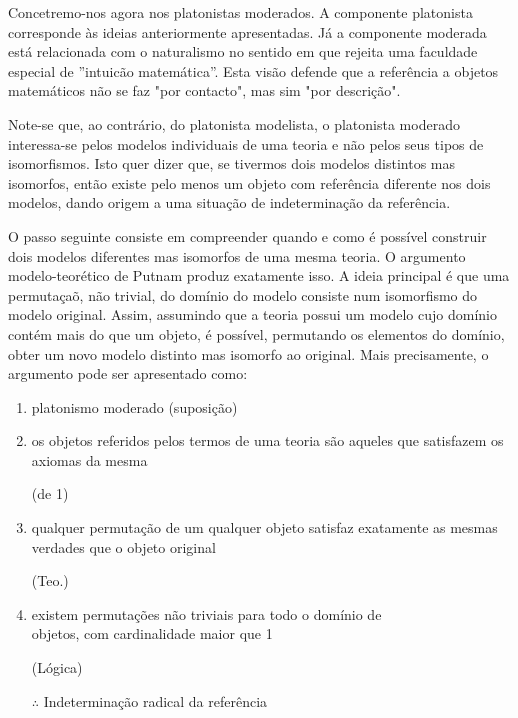 \documentclass{article}
\begin{document}
\vspace{2cm}

Concetremo-nos agora nos platonistas moderados. A componente platonista corresponde às ideias anteriormente apresentadas. Já a componente moderada está relacionada com o naturalismo no sentido em que rejeita uma faculdade especial de ”intuicão matemática”. Esta visão defende que a referência a objetos matemáticos não se faz "por contacto", mas sim "por descrição".

\vspace{0.5cm}

Note-se que, ao contrário, do platonista modelista, o platonista moderado interessa-se pelos modelos individuais de uma teoria e não pelos seus tipos de isomorfismos. Isto quer dizer que, se tivermos dois modelos distintos mas isomorfos, então existe pelo menos um objeto com referência diferente nos dois modelos, dando origem a uma situação de indeterminação da referência.

O passo seguinte consiste em compreender quando e como é possível construir dois modelos diferentes mas isomorfos de uma mesma teoria. O argumento modelo-teorético de Putnam produz exatamente isso. A ideia principal é que uma permutaçaõ, não trivial, do domínio do modelo consiste num isomorfismo do modelo original. Assim, assumindo que a teoria possui um modelo cujo domínio contém mais do que um objeto, é possível, permutando os elementos do domínio, obter um novo modelo distinto mas isomorfo ao original. Mais precisamente, o argumento pode ser apresentado como:

\begin{enumerate}
    \item platonismo moderado                                                                               \hfill (suposição)
    \item \parbox[t]{0.9\linewidth}{%
    os objetos referidos pelos termos de uma teoria são aqueles que satisfazem
    os axiomas da mesma%
    }\hfill(de 1)
    
    \item \parbox[t]{0.9\linewidth}{%
    qualquer permutação de um qualquer objeto satisfaz exatamente as mesmas verdades que o objeto original%
    }\hfill(Teo.)
    
    \item \parbox[t]{0.9\linewidth}{%
    existem permutações não triviais para todo o domínio de \\objetos, com cardinalidade maior que 1%
    }\hfill(Lógica)

    
    $\therefore$ Indeterminação radical da referência
\end{enumerate}
\end{document}
